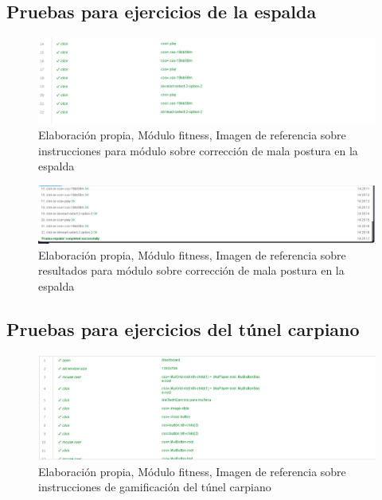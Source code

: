 

\subsection{Pruebas para ejercicios de la espalda}

\begin{figure}[H]
  \centering
  \includegraphics[width=1\linewidth]{Imagenes/Imagen4.png}
  \caption{Elaboración propia, Módulo fitness, Imagen de referencia sobre instrucciones para módulo sobre corrección de mala postura en la espalda}
  \label{fig:Imagen8fitness}
\end{figure}

\begin{figure}[H]
  \centering
  \includegraphics[width=1\linewidth]{Imagenes/Imagen5.png}
  \caption{Elaboración propia, Módulo fitness, Imagen de referencia sobre resultados para módulo sobre corrección de mala postura en la espalda}
  \label{fig:Imagen9fitness}
\end{figure}

\subsection{Pruebas para ejercicios del túnel carpiano}
\begin{figure}[H]
  \centering
  \includegraphics[width=1\linewidth]{Imagenes/Imagen7.png}
  \caption{Elaboración propia, Módulo fitness, Imagen de referencia sobre instrucciones de gamificación del túnel carpiano}
  \label{fig:Imagen10fitness}
\end{figure}

